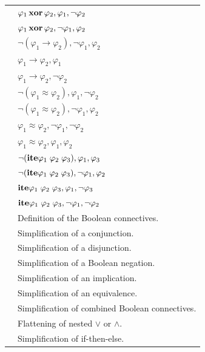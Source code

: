 \begin{xltabular}{\linewidth}{l X}
 & $ \varphi_1 \,\mathbf{xor}\, \varphi_2, \varphi_1 , \neg \varphi_2 $ \\
 & $ \varphi_1 \,\mathbf{xor}\, \varphi_2, \neg \varphi_1 , \varphi_2 $ \\
 & $ \neg (\varphi_1 \rightarrow \varphi_2), \neg \varphi_1 , \varphi_2 $ \\
 & $ \varphi_1 \rightarrow \varphi_2, \varphi_1 $ \\
 & $ \varphi_1 \rightarrow \varphi_2, \neg \varphi_2 $ \\
 & $\neg (\varphi_1 ≈ \varphi_2) , \varphi_1 , \neg \varphi_2$ \\
 & $\neg (\varphi_1 ≈ \varphi_2) , \neg \varphi_1 , \varphi_2$ \\
 & $\varphi_1 ≈ \varphi_2 , \neg \varphi_1 , \neg \varphi_2$ \\
 & $\varphi_1 ≈ \varphi_2 , \varphi_1 , \varphi_2$ \\
 & $\neg (\mathbf{ite} \varphi_1\;\varphi_2\;\varphi_3) , \varphi_1 , \varphi_3$ \\
 & $\neg (\mathbf{ite} \varphi_1\;\varphi_2\;\varphi_3) , \neg \varphi_1 , \varphi_2$ \\
 & $\mathbf{ite} \varphi_1\;\varphi_2\;\varphi_3 , \varphi_1 , \neg \varphi_3$ \\
 & $\mathbf{ite} \varphi_1\;\varphi_2\;\varphi_3 , \neg \varphi_1 , \neg \varphi_2$ \\
 & Definition of the Boolean connectives. \\
 & Simplification of a conjunction. \\
 & Simplification of a disjunction. \\
 & Simplification of a Boolean negation. \\
 & Simplification of an implication. \\
 & Simplification of an equivalence. \\
 & Simplification of combined Boolean connectives. \\
 & Flattening of nested $\lor$ or $\land$. \\
 & Simplification of if-then-else. \\

\end{xltabular}
